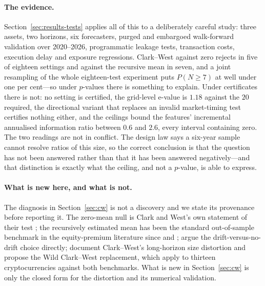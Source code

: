 \documentclass{article}
\theoremstyle{plain}
\theoremstyle{definition}
\begin{document}
\paragraph{The evidence.} Section~\ref{sec:results-tests} applies all of this to a
deliberately careful study: three assets, two horizons, six forecasters, purged and
embargoed walk-forward validation over 2020--2026, programmatic leakage tests, transaction
costs, execution delay and exposure regressions. Clark--West against zero rejects in five of
eighteen settings and against the recursive mean in seven, and a joint resampling of the
whole eighteen-test experiment puts $P(N\ge7)$ at well under one per cent---so under
$p$-values there is something to explain. Under certificates there is not: no setting is
certified, the grid-level e-value is $1.18$ against the $20$ required, the directional
variant that replaces an invalid market-timing test certifies nothing either, and the
ceilings bound the features' incremental annualised information ratio between $0.6$ and
$2.6$, every interval containing zero. The two readings are not in conflict. The design law says a six-year sample
cannot resolve ratios of this size, so the correct conclusion is that the question has not
been answered rather than that it has been answered negatively---and that distinction is
exactly what the ceiling, and not a $p$-value, is able to express.

\paragraph{What is new here, and what is not.}
The diagnosis in Section~\ref{sec:cw} is not a discovery and we state its provenance before
reporting it. The zero-mean null is Clark and West's own statement of their test
\citep{clark2006}; the recursively estimated mean has been the standard out-of-sample
benchmark in the equity-premium literature since \citet{welch2008} and \citet{campbell2008};
\citet{moosa2016} argue the drift-versus-no-drift choice directly; \citet{pincheira2021}
document Clark--West's long-horizon size distortion and propose the Wild Clark--West
replacement, which \citet{magner2022} apply to thirteen cryptocurrencies against both
benchmarks. What is new in Section~\ref{sec:cw} is only the closed form for the distortion
and its numerical validation.
\end{document}
